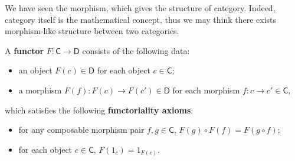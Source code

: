 We have seen the morphism, which gives the structure of category. Indeed, category itself is the mathematical concept, thus we may think there exists morphism-like structure between two categories.
\begin{defn} A \textbf{functor} $F:\mathsf{C}\rightarrow \mathsf{D}$ consists of the following data:
\begin{itemize}
\item an object $F(c)\in\mathsf{D}$ for each object $c\in \mathsf{C}$;
\item a morphism $F(f):F(c)\rightarrow F(c')\in \mathsf{D}$ for each morphism $f:c\rightarrow c'\in \mathsf{C}$,
\end{itemize}
which satisfies the following \textbf{functoriality axioms}:
\begin{itemize}
\item for any composable morphism pair $f,g\in\mathsf{C}$, $F(g)\circ F(f)=F(g\circ f)$;
\item for each object $c\in\mathsf{C}$, $F(1_c)=1_{F(c)}$.
\end{itemize}
\end{defn}
